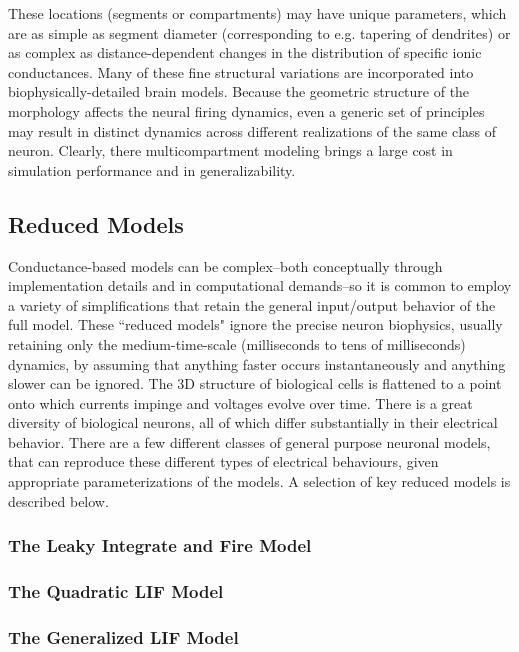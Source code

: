 These locations (segments or compartments) may have unique parameters, which are as simple as segment diameter (corresponding to e.g. tapering of dendrites) or as complex as distance-dependent changes in the distribution of specific ionic conductances.
Many of these fine structural variations are incorporated into biophysically-detailed brain models.  
Because the geometric structure of the morphology affects the neural firing dynamics, even a generic set of principles may result in distinct dynamics across different realizations of the same class of neuron.  
Clearly, there multicompartment modeling brings a large cost in simulation performance and in generalizability.

\subsection{Reduced Models}
Conductance-based models can be complex--both conceptually through implementation details and in computational demands--so it is common to employ a variety of simplifications that retain the general input/output behavior of the full model.
These ``reduced models" ignore the precise neuron biophysics, usually retaining only the medium-time-scale (milliseconds to tens of milliseconds) dynamics, by assuming that anything faster occurs instantaneously and anything slower can be ignored.
The 3D structure of biological cells is flattened to a point onto which currents impinge and voltages evolve over time. There is a great diversity of biological neurons, all of which differ substantially in their electrical behavior. There are a few different classes of general purpose neuronal models, that can reproduce these different types of electrical behaviours, given appropriate parameterizations of the models. A selection of key reduced models is described below.
\subsubsection{The Leaky Integrate and Fire Model}
\subsubsection{The Quadratic LIF Model}
\subsubsection{The Generalized LIF Model}


